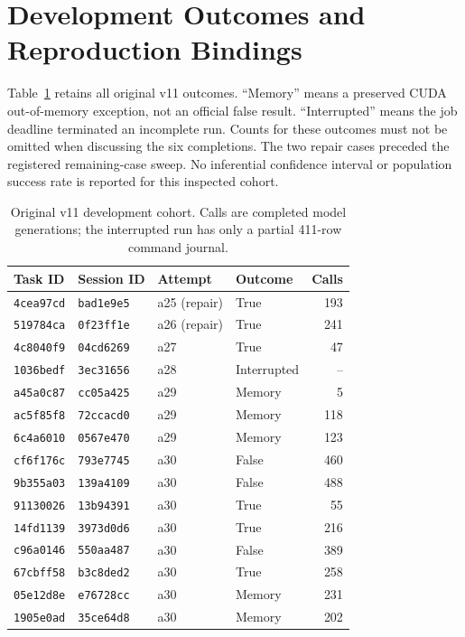 \documentclass{article}
\begin{document}


\appendix
\section{Development Outcomes and Reproduction Bindings}
\label{app:development}

Table~\ref{tab:development-cases} retains all original v11 outcomes. ``Memory'' means a preserved
CUDA out-of-memory exception, not an official false result. ``Interrupted''
means the job deadline terminated an incomplete run. Counts for these outcomes
must not be omitted when discussing the six completions. The two repair cases
preceded the registered remaining-case sweep. No inferential confidence interval
or population success rate is reported for this inspected cohort.

\begin{table}[h]
  \centering
  \caption{Original v11 development cohort. Calls are completed model generations;
  the interrupted run has only a partial 411-row command journal.}
  \label{tab:development-cases}
  \small
  \begin{tabular}{@{}llllr@{}}
    \toprule
    Task ID & Session ID & Attempt & Outcome & Calls \\
    \midrule
    \texttt{4cea97cd} & \texttt{bad1e9e5} & a25 (repair) & True & 193 \\
    \texttt{519784ca} & \texttt{0f23ff1e} & a26 (repair) & True & 241 \\
    \texttt{4c8040f9} & \texttt{04cd6269} & a27 & True & 47 \\
    \texttt{1036bedf} & \texttt{3ec31656} & a28 & Interrupted & -- \\
    \texttt{a45a0c87} & \texttt{cc05a425} & a29 & Memory & 5 \\
    \texttt{ac5f85f8} & \texttt{72ccacd0} & a29 & Memory & 118 \\
    \texttt{6c4a6010} & \texttt{0567e470} & a29 & Memory & 123 \\
    \texttt{cf6f176c} & \texttt{793e7745} & a30 & False & 460 \\
    \texttt{9b355a03} & \texttt{139a4109} & a30 & False & 488 \\
    \texttt{91130026} & \texttt{13b94391} & a30 & True & 55 \\
    \texttt{14fd1139} & \texttt{3973d0d6} & a30 & True & 216 \\
    \texttt{c96a0146} & \texttt{550aa487} & a30 & False & 389 \\
    \texttt{67cbff58} & \texttt{b3c8ded2} & a30 & True & 258 \\
    \texttt{05e12d8e} & \texttt{e76728cc} & a30 & Memory & 231 \\
    \texttt{1905e0ad} & \texttt{35ce64d8} & a30 & Memory & 202 \\
    \bottomrule
  \end{tabular}
\end{table}
\end{document}

